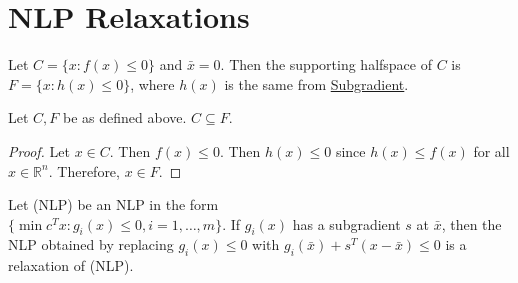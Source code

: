 \documentclass[a4paper]{report}
\begin{document}
	\section{NLP Relaxations}
	\begin{definition}
		\label{supporting} Let $C = \{x : f(x) \leq 0\}$ and $\bar x = 0$. Then the
		supporting halfspace of $C$ is $F = \{x: h(x) \leq 0 \}$, where $h(x)$ is the
		same from \hyperref[subgradient]{Subgradient}.
	\end{definition}
	\begin{proposition}
		Let $C, F$ be as defined above. $C \subseteq F$.
	\end{proposition}
	\begin{proof}
		Let $x \in C$. Then $f(x) \leq 0$. Then $h(x) \leq 0$ since $h(x) \leq f(x)$
		for all $x \in \mathbb{R}^{n}$. Therefore, $x \in F$.
	\end{proof}

	\begin{corollary}
		\label{nlp} Let (NLP) be an NLP in the form \\$\{\min c^{T}x : g_{i}(x) \leq
		0, i = 1, \dots, m\}$. If $g_{i}(x)$ has a subgradient $s$ at $\bar x$, then
		the NLP obtained by replacing $g_{i}(x) \leq 0$ with
		$g_{i}(\bar x) + s^{T}(x - \bar x)\leq 0$ is a relaxation of (NLP).
	\end{corollary}

	\newpage
\end{document}
